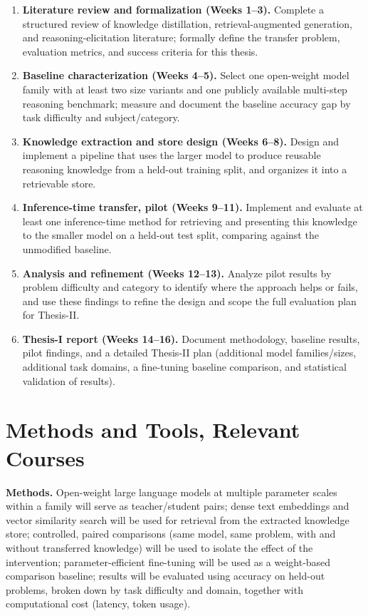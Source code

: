 \documentclass[a4, 12pt]{article}
\begin{document}
\begin{enumerate}
    \item \textbf{Literature review and formalization (Weeks 1--3).} Complete a structured review of knowledge distillation, retrieval-augmented generation, and reasoning-elicitation literature; formally define the transfer problem, evaluation metrics, and success criteria for this thesis.
    \item \textbf{Baseline characterization (Weeks 4--5).} Select one open-weight model family with at least two size variants and one publicly available multi-step reasoning benchmark; measure and document the baseline accuracy gap by task difficulty and subject/category.
    \item \textbf{Knowledge extraction and store design (Weeks 6--8).} Design and implement a pipeline that uses the larger model to produce reusable reasoning knowledge from a held-out training split, and organizes it into a retrievable store.
    \item \textbf{Inference-time transfer, pilot (Weeks 9--11).} Implement and evaluate at least one inference-time method for retrieving and presenting this knowledge to the smaller model on a held-out test split, comparing against the unmodified baseline.
    \item \textbf{Analysis and refinement (Weeks 12--13).} Analyze pilot results by problem difficulty and category to identify where the approach helps or fails, and use these findings to refine the design and scope the full evaluation plan for Thesis-II.
    \item \textbf{Thesis-I report (Weeks 14--16).} Document methodology, baseline results, pilot findings, and a detailed Thesis-II plan (additional model families/sizes, additional task domains, a fine-tuning baseline comparison, and statistical validation of results).
\end{enumerate}

\section{Methods and Tools, Relevant Courses}

\textbf{Methods.} Open-weight large language models at multiple parameter scales within a family will serve as teacher/student pairs; dense text embeddings and vector similarity search will be used for retrieval from the extracted knowledge store; controlled, paired comparisons (same model, same problem, with and without transferred knowledge) will be used to isolate the effect of the intervention; parameter-efficient fine-tuning will be used as a weight-based comparison baseline; results will be evaluated using accuracy on held-out problems, broken down by task difficulty and domain, together with computational cost (latency, token usage).
\end{document}
